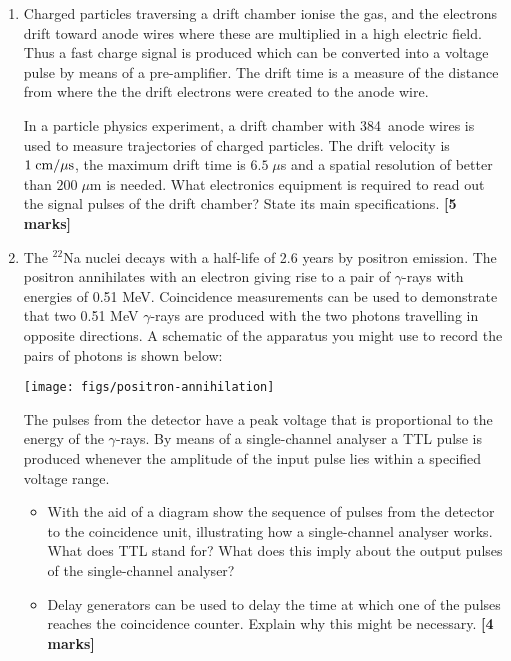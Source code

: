 \begin{enumerate}
The I2C bus allows you to connect multiple devices.
How many PCF8574AN chips can be controlled in total from one Raspberry Pi?

[ Hint: You need to consult the PCF8574AN data sheet.
Note that the prefix {\tt 0x} is used for representing numbers in hexadecimal notation. ]
%
\hfill {\bf [2 marks]}\\

\item Charged particles traversing a drift chamber ionise the gas, and the electrons drift toward anode wires where these are multiplied in a high electric field.
Thus a fast charge signal is produced which can be converted into a voltage pulse by means of a pre-amplifier. 
The drift time is a measure of the distance from where the the drift electrons were created to the anode wire.

In a particle physics experiment, a drift chamber with 384~anode wires is used to measure trajectories of charged particles.
The drift velocity is $1\; {\rm cm/\mu s}$, the maximum drift time is $6.5 \; \mu$s
and a spatial resolution of better than $200\; \mu$m is needed.
What electronics equipment is required to read out the signal pulses of the drift chamber? State its main specifications.
\hfill {\bf [5 marks]}\\

\item The $^{22}$Na nuclei decays with a half-life of 2.6 years by positron emission.
The positron annihilates with an electron giving rise to a pair of $\gamma$-rays with energies of 0.51 MeV.
Coincidence measurements can be used to demonstrate that two 0.51 MeV $\gamma$-rays are produced with the two photons travelling in opposite directions.
A schematic of the apparatus you might use to record the pairs of photons is shown below:
%
\begin{center}
  {\texttt{[image: figs/positron-annihilation]}}
\end{center}
%
The pulses from the detector have a peak voltage that is proportional to the energy of the $\gamma$-rays.
By means of a single-channel analyser a TTL pulse is produced whenever the amplitude of the input pulse lies within a specified voltage range.
\begin{itemize}
\item With the aid of a diagram show the sequence of pulses from the detector to the coincidence unit, illustrating how a single-channel analyser works.
What does TTL stand for?
What does this imply about the output pulses of the single-channel analyser?
\item Delay generators can be used to delay the time at which one of the pulses reaches the coincidence counter.
Explain why this might be necessary. %
%
\hfill {\bf [4 marks]}
%
\end{itemize}




\end{enumerate}
